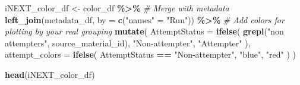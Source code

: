 \documentclass[
]{article}
\newenvironment{Shaded}{\begin{snugshade}}{\end{snugshade}}
\newcommand{\AttributeTok}[1]{\textcolor[rgb]{0.13,0.29,0.53}{#1}}
\newcommand{\CommentTok}[1]{\textcolor[rgb]{0.56,0.35,0.01}{\textit{#1}}}
\newcommand{\FunctionTok}[1]{\textcolor[rgb]{0.13,0.29,0.53}{\textbf{#1}}}
\newcommand{\NormalTok}[1]{#1}
\newcommand{\OtherTok}[1]{\textcolor[rgb]{0.56,0.35,0.01}{#1}}
\newcommand{\SpecialCharTok}[1]{\textcolor[rgb]{0.81,0.36,0.00}{\textbf{#1}}}
\newcommand{\StringTok}[1]{\textcolor[rgb]{0.31,0.60,0.02}{#1}}
\begin{document}
\begin{Shaded}
\begin{Highlighting}[]
\NormalTok{iNEXT\_color\_df }\OtherTok{\textless{}{-}} 
\NormalTok{  color\_df }\SpecialCharTok{\%\textgreater{}\%}
  \CommentTok{\# Merge with metadata}
  \FunctionTok{left\_join}\NormalTok{(metadata\_df, }\AttributeTok{by =} \FunctionTok{c}\NormalTok{(}\StringTok{"names"} \OtherTok{=} \StringTok{"Run"}\NormalTok{)) }\SpecialCharTok{\%\textgreater{}\%}
  \CommentTok{\# Add colors for plotting by your real grouping}
  \FunctionTok{mutate}\NormalTok{(}
    \AttributeTok{AttemptStatus =} \FunctionTok{ifelse}\NormalTok{(}
      \FunctionTok{grepl}\NormalTok{(}\StringTok{"non attempters"}\NormalTok{, source\_material\_id),}
      \StringTok{"Non{-}attempter"}\NormalTok{,}
      \StringTok{"Attempter"}
\NormalTok{    ),}
    \AttributeTok{attempt\_colors =} \FunctionTok{ifelse}\NormalTok{(}
\NormalTok{      AttemptStatus }\SpecialCharTok{==} \StringTok{"Non{-}attempter"}\NormalTok{,}
      \StringTok{"blue"}\NormalTok{,}
      \StringTok{"red"}
\NormalTok{    )}
\NormalTok{  )}

\FunctionTok{head}\NormalTok{(iNEXT\_color\_df)}
\end{Highlighting}
\end{Shaded}
\end{document}
